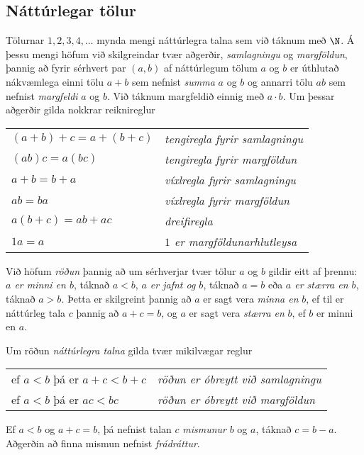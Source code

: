 \subsection*{Náttúrlegar tölur}

Tölurnar $1,2,3,4,\dots$ mynda mengi náttúrlegra talna sem við táknum
með $\N$.   Á þessu mengi höfum við skilgreindar tvær aðgerðir, {\it
samlagningu} og {\it margföldun}, þannig
að fyrir sérhvert par $(a,b)$ af náttúrlegum tölum $a$ og $b$ er
úthlutað nákvæmlega einni tölu $a+b$ sem nefnist {\it summa} $a$ og
$b$ og annarri tölu $ab$ sem nefnist {\it margfeldi} $a$ og $b$.
Við táknum margfeldið einnig með $a\cdot b$.
Um þessar aðgerðir gilda nokkrar reiknireglur

\begin{center}
\begin{tabular}{ll}
$(a+b)+c=a+(b+c)$&{\it tengiregla fyrir samlagningu}\\
$(ab)c=a(bc)$&{\it tengiregla fyrir margföldun}\\
$a+b=b+a$ &{\it víxlregla fyrir samlagningu} \\
$ab=ba$ &{\it víxlregla fyrir margföldun} \\
$a(b+c)=ab+ac$&{\it dreifiregla}\\
$1a=a$ &{\it $1$ er margföldunarhlutleysa}\\
\end{tabular}
\end{center}
 
Við höfum {\it röðun} þannig að um sérhverjar tvær tölur $a$ og $b$
gildir eitt af þrennu: {\it $a$ er minni en $b$}, táknað $a<b$, {\it
$a$ er jafnt og $b$}, táknað $a=b$ eða {\it $a$ er stærra en $b$},
táknað $a>b$.  Þetta er skilgreint þannig að $a$ er sagt vera {\it minna en} $b$, ef til er
náttúrleg tala $c$ þannig að $a+c=b$, og $a$ er sagt vera {\it stærra
en} $b$,  ef $b$ er minni en $a$.  


Um röðun {\it náttúrlegra talna} gilda tvær mikilvægar reglur 
\begin{center}
\begin{tabular}{ll}
ef $a<b$ þá er $a+c<b+c$&{\it röðun er óbreytt við samlagningu}\\
ef $a<b$ þá er $ac<bc$&{\it röðun er óbreytt við margföldun}\\
\end{tabular}
\end{center}

Ef $a<b$ og $a+c=b$, þá nefnist talan $c$ {\it mismunur } $b$ og $a$,
táknað $c=b-a$. Aðgerðin að finna 
mismun nefnist {\it frádráttur}.

